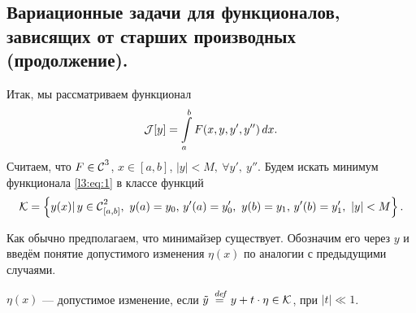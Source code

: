 	\chapter{}
\label{lecture3}
\section[Задачи для функционалов, зависящих от старших производных (продолжение).]{Вариационные задачи для функционалов, зависящих от старших производных (продолжение).}
\label{lecture3section1}

Итак, мы рассматриваем функционал 
\begin{equation}
	\label{l3:eq:1}
	\hfill\J[y]=\int\limits_a^b F(x,y,y',y'')\,dx.\hfill
\end{equation}
Считаем, что $F\in\mathcal{C}{\mathstrut}^{3}_{}$, $x\in[a,b]$, $|y|<M,\ \forall y',\ y''$. 
Будем искать минимум функционала \eqref{l3:eq:1} в классе функций
\begin{equation*}
	\hfill\K=\left\{y(x)|\,y\in\Cfn[{[a,b]}]{2},\ y(a)=y_0,\,y'(a)=y'_0,\ y(b)=y_1,\,y'(b)=y'_1,\ |y|<M\right\}.\hfill
\end{equation*}

Как обычно предполагаем, что минимайзер существует. Обозначим его через $y$ и введём понятие допустимого изменения $\eta(x)$ по аналогии с предыдущими случаями.
\begin{_def}
	$\eta(x)$ --- допустимое изменение, если $\tilde{y}\stackrel{\hspace{0.09 cm}de\!f}{=} y+t\cdot\eta\in\mathcal{K}$, при $|t|\ll1$.
\end{_def} 

